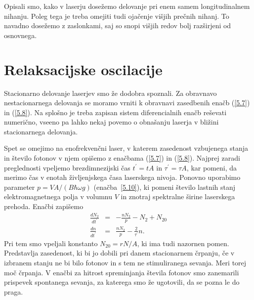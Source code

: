 Opisali smo, kako v laserju dosežemo delovanje pri enem samem longitudinalnem nihanju.
Poleg tega je treba omejiti tudi ojačenje višjih prečnih nihanj. To navadno 
dosežemo z zaslonkami, saj so snopi višjih redov bolj razširjeni od osnovnega. 

\section{Relaksacijske oscilacije}
Stacionarno delovanje laserjev smo že dodobra spoznali. Za obravnavo
nestacionarnega delovanja  se moramo vrniti k obravnavi zasedbenih enačb 
(\ref{5.7}) in (\ref{5.8}). Na splošno je treba zapisan sistem diferencialnih
enačb reševati numerično, vseeno pa lahko nekaj povemo o obnašanju laserja
v bližini stacionarnega delovanja. 

Spet se omejimo na enofrekvenčni laser, v katerem zasedenost vzbujenega stanja
in število fotonov v njem opišemo z enačbama (\ref{5.7})
in (\ref{5.8}). Najprej zaradi preglednosti vpeljemo
brezdimnezijski čas $t^{\prime}=t A$ in $\tau^{\prime}=\tau A$, kar pomeni, da merimo 
čas v enotah življenjskega časa laserskega nivoja. Ponovno uporabimo parameter
$p=VA/(B\hbar\omega g)$ (enačba~\ref{5.10}), ki pomeni število lastnih stanj 
elektromagnetnega polja v volumnu $V$ in znotraj spektralne širine laserskega prehoda. 
Enačbi zapišemo 
\begin{eqnarray}  
\frac{d N_2}{d t^{\prime}}&=&-\frac{nN_2}{p}-N_2+N_{20} \label{5.23a} \\
\frac{d n}{d t^{\prime}}& = & \frac{nN_2}{p}-\frac{2}{\tau^{\prime}}n.
\label{5.23}
\end{eqnarray}
Pri tem smo vpeljali konstanto $N_{20}= rN/A$, ki ima tudi nazornen pomen.
Predstavlja zasedenost, ki bi jo dobili pri danem stacionarnem črpanju, če v
izbranem stanju ne bi bilo fotonov in s tem ne stimuliranega sevanja. Meri torej 
moč črpanja. V enačbi za hitrost spreminjanja števila fotonov
smo zanemarili prispevek spontanega sevanja, za katerega smo že ugotovili,
da se pozna le do praga.

